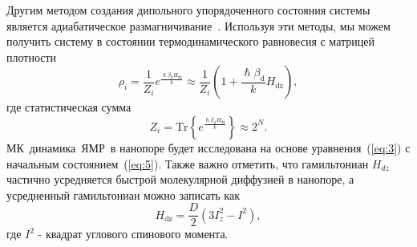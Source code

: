 \documentclass[utf8]{jetp}
\newcommand{\hdz}{H_\mathrm{dz}}
\begin{document}
Другим методом создания  дипольного упорядоченного состояния системы является адиабатическое размагничивание~\cite{Goldman_1970,Slichter_1961}.
Используя эти методы, мы можем получить систему в состоянии термодинамического равновесия с матрицей плотности
%
\begin{equation}
  \label{eq:5}
  \rho_i = \frac{1}{Z_i} e^\frac{\hslash\beta_\mathrm{d} \hdz}{k}
  \approx \frac{1}{Z_i}(1 + \frac{\hslash\beta_\mathrm{d}}{k} H_\mathrm{dz}),
\end{equation}
%
где статистическая сумма
%
\begin{equation}
  \label{eq:6}
	Z_i = \mathrm{Tr} \left\{ e^\frac{\hslash\beta_\mathrm{d} \hdz}{k} \right\} \approx 2^{N}.
\end{equation}
%
МК~динамика~ЯМР~в нанопоре будет исследована на основе уравнения~(\ref{eq:3}) с начальным состоянием~(\ref{eq:5}).
Также важно отметить, что гамильтониан $H_{dz}$ частично усредняется быстрой молекулярной диффузией в нанопоре, а усредненный гамильтониан можно записать как \cite{Fel_dman_2004,Doronin_2011}
%
\begin{equation}
  \label{eq:7}
  H_\mathrm{dz} = \dfrac{D}{2} (3 I^{2}_{z} - I^{2}) , %
\end{equation}
%
где $I^{2}$ - квадрат углового спинового  момента.
\end{document}
